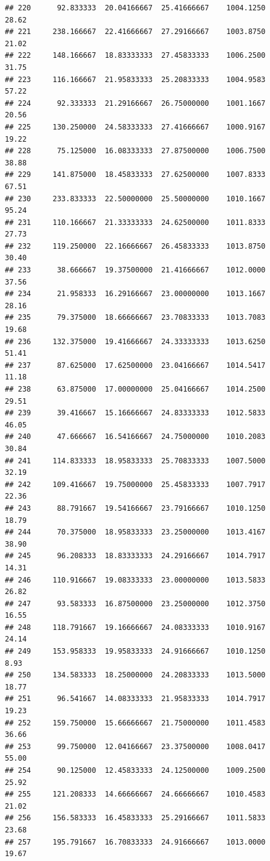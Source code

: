 \documentclass[
]{article}
\begin{document}
\begin{verbatim}
## 220      92.833333  20.04166667  25.41666667    1004.1250       28.62
## 221     238.166667  22.41666667  27.29166667    1003.8750       21.02
## 222     148.166667  18.83333333  27.45833333    1006.2500       31.75
## 223     116.166667  21.95833333  25.20833333    1004.9583       57.22
## 224      92.333333  21.29166667  26.75000000    1001.1667       20.56
## 225     130.250000  24.58333333  27.41666667    1000.9167       19.22
## 228      75.125000  16.08333333  27.87500000    1006.7500       38.88
## 229     141.875000  18.45833333  27.62500000    1007.8333       67.51
## 230     233.833333  22.50000000  25.50000000    1010.1667       95.24
## 231     110.166667  21.33333333  24.62500000    1011.8333       27.73
## 232     119.250000  22.16666667  26.45833333    1013.8750       30.40
## 233      38.666667  19.37500000  21.41666667    1012.0000       37.56
## 234      21.958333  16.29166667  23.00000000    1013.1667       28.16
## 235      79.375000  18.66666667  23.70833333    1013.7083       19.68
## 236     132.375000  19.41666667  24.33333333    1013.6250       51.41
## 237      87.625000  17.62500000  23.04166667    1014.5417       11.18
## 238      63.875000  17.00000000  25.04166667    1014.2500       29.51
## 239      39.416667  15.16666667  24.83333333    1012.5833       46.05
## 240      47.666667  16.54166667  24.75000000    1010.2083       30.84
## 241     114.833333  18.95833333  25.70833333    1007.5000       32.19
## 242     109.416667  19.75000000  25.45833333    1007.7917       22.36
## 243      88.791667  19.54166667  23.79166667    1010.1250       18.79
## 244      70.375000  18.95833333  23.25000000    1013.4167       38.90
## 245      96.208333  18.83333333  24.29166667    1014.7917       14.31
## 246     110.916667  19.08333333  23.00000000    1013.5833       26.82
## 247      93.583333  16.87500000  23.25000000    1012.3750       16.55
## 248     118.791667  19.16666667  24.08333333    1010.9167       24.14
## 249     153.958333  19.95833333  24.91666667    1010.1250        8.93
## 250     134.583333  18.25000000  24.20833333    1013.5000       18.77
## 251      96.541667  14.08333333  21.95833333    1014.7917       19.23
## 252     159.750000  15.66666667  21.75000000    1011.4583       36.66
## 253      99.750000  12.04166667  23.37500000    1008.0417       55.00
## 254      90.125000  12.45833333  24.12500000    1009.2500       25.92
## 255     121.208333  14.66666667  24.66666667    1010.4583       21.02
## 256     156.583333  16.45833333  25.29166667    1011.5833       23.68
## 257     195.791667  16.70833333  24.91666667    1013.0000       19.67

\end{verbatim}
\end{document}
